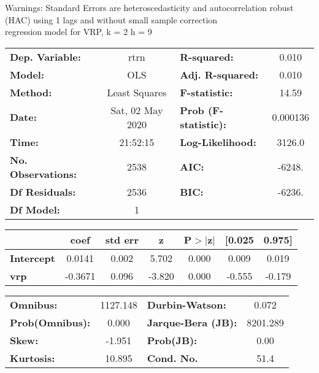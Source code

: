 Warnings: \newline
 [1] Standard Errors are heteroscedasticity and autocorrelation robust (HAC) using 1 lags and without small sample correction\\ 

regression model for VRP, k = 2 h = 9\begin{center}
\begin{tabular}{lclc}
\toprule
\textbf{Dep. Variable:}    &       rtrn       & \textbf{  R-squared:         } &     0.010   \\
\textbf{Model:}            &       OLS        & \textbf{  Adj. R-squared:    } &     0.010   \\
\textbf{Method:}           &  Least Squares   & \textbf{  F-statistic:       } &     14.59   \\
\textbf{Date:}             & Sat, 02 May 2020 & \textbf{  Prob (F-statistic):} &  0.000136   \\
\textbf{Time:}             &     21:52:15     & \textbf{  Log-Likelihood:    } &    3126.0   \\
\textbf{No. Observations:} &        2538      & \textbf{  AIC:               } &    -6248.   \\
\textbf{Df Residuals:}     &        2536      & \textbf{  BIC:               } &    -6236.   \\
\textbf{Df Model:}         &           1      & \textbf{                     } &             \\
\bottomrule
\end{tabular}
\begin{tabular}{lcccccc}
                   & \textbf{coef} & \textbf{std err} & \textbf{z} & \textbf{P$> |$z$|$} & \textbf{[0.025} & \textbf{0.975]}  \\
\midrule
\textbf{Intercept} &       0.0141  &        0.002     &     5.702  &         0.000        &        0.009    &        0.019     \\
\textbf{vrp}       &      -0.3671  &        0.096     &    -3.820  &         0.000        &       -0.555    &       -0.179     \\
\bottomrule
\end{tabular}
\begin{tabular}{lclc}
\textbf{Omnibus:}       & 1127.148 & \textbf{  Durbin-Watson:     } &    0.072  \\
\textbf{Prob(Omnibus):} &   0.000  & \textbf{  Jarque-Bera (JB):  } & 8201.289  \\
\textbf{Skew:}          &  -1.951  & \textbf{  Prob(JB):          } &     0.00  \\
\textbf{Kurtosis:}      &  10.895  & \textbf{  Cond. No.          } &     51.4  \\
\bottomrule
\end{tabular}
\end{center}

